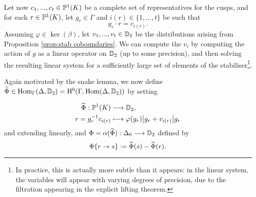 \documentclass[a4paper,11pt]{article}
\numberwithin{equation}{section}
\begin{document}
Let now $c_1, ..., c_t \in \mathbb{P}^1(K)$ be a complete set of representatives for the cusps, and for each $r \in \mathbb{P}^1(K)$, let $g_r \in \Gamma$ and $i(r) \in \{1,...,t\}$ be such that
\[
	g_r \cdot r = c_{i(r)}.
\]
Assuming $\varphi \in \ker(\beta)$, let $v_1, ..., v_t \in \mathbb{D}_2$ be the distributions arising from Proposition \ref{prop:stab coboundaries}. We can compute the $v_i$ by computing the action of $g$ as a linear operator on $\mathbb{D}_2$ (up to some precision), and then solving the resulting linear system for a sufficiently large set of elements of the stabiliser\footnote{In practice, this is actually more subtle than it appears: in the linear system, the variables will appear with varying degrees of precision, due to the filtration appearing in the explicit lifting theorem.}.

Again motivated by the snake lemma, we now define $\widetilde{\Phi} \in \mathrm{Hom}_\Gamma(\Delta,\mathbb{D}_2) = \mathrm{H}^0(\Gamma,\mathrm{Hom}(\Delta,\mathbb{D}_2))$ by setting

	\begin{align*}
		\widetilde{\Phi} : \mathbb{P}^1(K) &\longrightarrow \mathbb{D}_2,\\
				r = g_r^{-1}c_{i(r)} &\longmapsto \varphi(g_r)\big|g_r + v_{i(r)}\big|g_r
	\end{align*}
	and extending linearly, and $\Phi = \alpha(\widetilde{\Phi}) : \Delta_0 \longrightarrow \mathbb{D}_2$ defined by
	\[
		\Phi\{r\to s\} \defeq \widetilde{\Phi}(s) - \widetilde{\Phi}(r).
	\]



\end{document}
